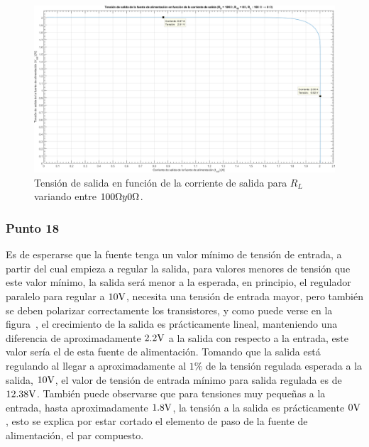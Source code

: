 \begin{figure}[H] %
\begin{center}
\includegraphics[width=1.2 \textwidth, angle=90]{./img/preguntas/p21_15.png}
\caption{\label{fig:fig_p21_p15_voltage_vs_current}\footnotesize{Tensión de salida en función de la corriente de salida para $R_{L}$ variando entre $100 \si[per-mode=symbol]{\ohm} y 0 \si[per-mode=symbol]{\ohm}$.}}
\end{center}
\end{figure}



\clearpage



\subsubsection{Punto 18}



Es de esperarse que la fuente tenga un valor mínimo de tensión de entrada, a partir del cual empieza a regular la salida, para valores menores de tensión que este valor mínimo, la salida será menor a la esperada, en principio, el regulador paralelo para regular a $10 \si[per-mode=symbol]{\volt}$, necesita una tensión de entrada mayor, pero también se deben polarizar correctamente los transistores, y como puede verse en la figura~, el crecimiento de la salida es prácticamente lineal, manteniendo una diferencia de aproximadamente $2.2 \si[per-mode=symbol]{\volt}$ a la salida con respecto a la entrada, este valor sería el  de esta fuente de alimentación. Tomando que la salida está regulando al 
llegar a aproximadamente al $1 \%$ de la tensión regulada esperada a la salida, $10 \si[per-mode=symbol]{\volt}$, el valor de tensión de entrada mínimo para salida regulada es de $12.38 \si[per-mode=symbol]{\volt}$. También puede observarse que para tensiones muy pequeñas a la entrada, hasta aproximadamente $1.8 \si[per-mode=symbol]{\volt}$, la tensión a la salida es prácticamente $0 \si[per-mode=symbol]{\volt}$, esto se explica por estar cortado el elemento de paso de la fuente de alimentación, el par compuesto.

